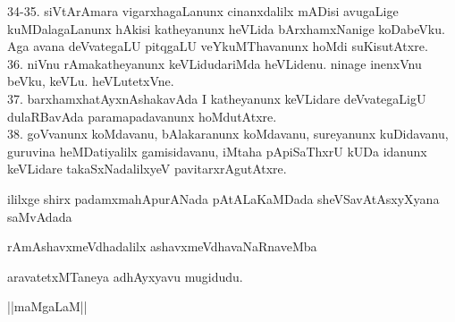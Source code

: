 \documentclass{article}
\begin{document}
34-35. siVtArAmara vigarxhagaLanunx cinanxdalilx mADisi avugaLige kuMDalagaLanunx hAkisi katheyanunx heVLida bArxhamxNanige koDabeVku. Aga avana deVvategaLU pitqgaLU veYkuMThavanunx hoMdi suKisutAtxre.\\
36. niVnu rAmakatheyanunx keVLidudariMda heVLidenu. ninage inenxVnu beVku, keVLu. heVLutetxVne.\\
37. barxhamxhatAyxnAshakavAda I katheyanunx keVLidare deVvategaLigU dulaRBavAda paramapadavanunx hoMdutAtxre.\\
38. goVvanunx koMdavanu, bAlakaranunx koMdavanu, sureyanunx kuDidavanu, guruvina heMDatiyalilx gamisidavanu, iMtaha pApiSaThxrU kUDa idanunx keVLidare takaSxNadalilxyeV pavitarxrAgutAtxre.\\

\begin{center}
ililxge shirx padamxmahApurANada pAtALaKaMDada sheVSavAtAsxyXyana saMvAdada
\end{center}

\begin{center}
rAmAshavxmeVdhadalilx ashavxmeVdhavaNaRnaveMba
\end{center}

\begin{center}
aravatetxMTaneya adhAyxyavu mugidudu.
\end{center}

\begin{center}
||maMgaLaM||
\end{center}
\end{document}
